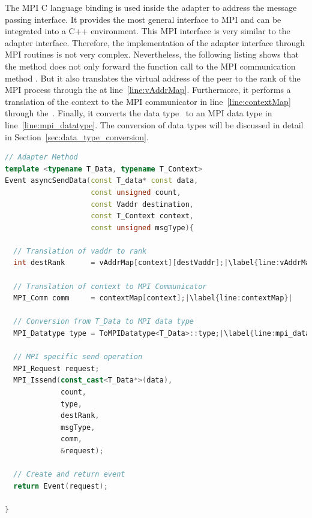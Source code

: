
The MPI C language binding is used inside the adapter to address the
message passing interface.  It provides the most general interface to
MPI and can be integrated into a C++ environment.  This MPI interface
is very similar to the adapter interface. Therefore, the
implementation of the adapter interface through MPI routines is not
very complex. Nevertheless, the following listing shows that the
 method does not only forward the function call to
the MPI communication method .  But it also translates
the virtual address  of the peer to the rank of the
MPI process through the  at line~\ref{line:vAddrMap}.
Furthermore, it performs a translation of the context to the MPI
communicator in line~\ref{line:contextMap} through
the~. Finally, it converts the data type~
to an MPI data type in line~\ref{line:mpi_datatype}.  The conversion
of data types will be discussed in detail in
Section~\ref{sec:data_type_conversion}.

\begin{minipage}[t]{\textwidth} 
\begin{lstlisting}[language=C++, breaklines=false, caption={Communication method for non-blocking sending of data. The virtual address of the destination is translated to its MPI rank. The context is translated to an MPI communicator and the template data type \cpp{T\_Data} is translated to an MPI data type. The communication operation is finally performed by MPI.}, label={lst:adapter_send}, escapechar=|]
// Adapter Method
template <typename T_Data, typename T_Context>      
Event asyncSendData(const T_data* const data, 
                    const unsigned count, 
                    const Vaddr destination, 
                    const T_Context context, 
                    const unsigned msgType){    

  // Translation of vaddr to rank
  int destRank      = vAddrMap[context][destVaddr];|\label{line:vAddrMap}|

  // Translation of context to MPI Communicator
  MPI_Comm comm     = contextMap[context];|\label{line:contextMap}|

  // Conversion from T_Data to MPI data type
  MPI_Datatype type = ToMPIDatatype<T_Data>::type;|\label{line:mpi_datatype}|

  // MPI specific send operation                                                                            
  MPI_Request request; 
  MPI_Issend(const_cast<T_Data*>(data), 
             count, 
             type,
             destRank, 
             msgType,
             comm,
             &request);

  // Create and return event
  return Event(request);                                                                                                       

}  
\end{lstlisting}
\end{minipage}

